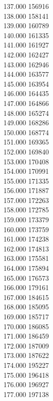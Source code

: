 { 137.000	156916 \\
 138.000	158141 \\
 139.000	160789 \\
 140.000	161335 \\
 141.000	161927 \\
 142.000	162427 \\
 143.000	162946 \\
 144.000	163577 \\
 145.000	163954 \\
 146.000	164435 \\
 147.000	164866 \\
 148.000	165274 \\
 149.000	168286 \\
 150.000	168774 \\
 151.000	169365 \\
 152.000	169840 \\
 153.000	170408 \\
 154.000	170991 \\
 155.000	171335 \\
 156.000	171887 \\
 157.000	172263 \\
 158.000	172785 \\
 159.000	173379 \\
 160.000	173759 \\
 161.000	174238 \\
 162.000	174813 \\
 163.000	175581 \\
 164.000	175894 \\
 165.000	176573 \\
 166.000	179161 \\
 167.000	184615 \\
 168.000	185095 \\
 169.000	185717 \\
 170.000	186085 \\
 171.000	186459 \\
 172.000	187009 \\
 173.000	187622 \\
 174.000	195227 \\
 175.000	196418 \\
 176.000	196927 \\
 177.000	197138 \\
}
